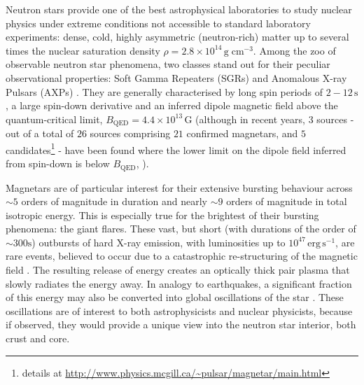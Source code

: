 \documentclass[numberedappendix]{emulateapj}
\begin{document}
Neutron stars provide one of the best astrophysical laboratories to study nuclear physics under extreme conditions not accessible to standard laboratory experiments: dense, cold, highly asymmetric (neutron-rich) matter up to several times the nuclear saturation density $\rho = 2.8\times10^{14} \, \mathrm{g}\; \mathrm{cm}^{-3}$.
Among the zoo of observable neutron star phenomena, two classes stand out for their peculiar observational properties: Soft Gamma Repeaters (SGRs) and Anomalous X-ray Pulsars (AXPs) \citep[both classes are  \textit{magnetars}; for a general overview, see ][]{woods2006,mereghetti2011}.
They are generally characterised by long spin periods of $2 - 12 \, \mathrm{s}$, a large spin-down derivative and an inferred dipole magnetic field above the quantum-critical limit, $B_{\mathrm{QED}} = 4.4 \times 10^{13} \, \mathrm{G}$ (although in recent years, $3$ sources - out of a total of $26$ sources comprising $21$ confirmed magnetars, and $5$ candidates\footnote{details at \url{http://www.physics.mcgill.ca/~pulsar/magnetar/main.html}} - have been found where the lower limit on the dipole field inferred from spin-down is below $B_{\mathrm{QED}}$,  \citet{vanderhorst2010,esposito2010,rea2010,rea2012,scholz2012,rea2014}). 

Magnetars are of particular interest for their extensive bursting behaviour across $\sim\!\! 5$ orders of magnitude in duration and nearly $\sim\!\! 9$ orders of magnitude in total isotropic energy. This is especially true for the brightest of their bursting phenomena: the giant flares. These vast, but short (with durations of the order of $\sim\!\! 300\mathrm{s}$) outbursts of hard X-ray emission, with luminosities up to $10^{47}\,\mathrm{erg}\, \mathrm{s}^{-1}$, are rare events, believed to occur due to a catastrophic re-structuring of the magnetic field \citep{thompson1995,lyutikov2003}.  The resulting release of energy creates an optically thick pair plasma that slowly radiates the energy away. In analogy to earthquakes, a significant fraction of this energy may also be converted into global oscillations of the star \citep{duncan1998}. These oscillations are of interest to both astrophysicists and nuclear physicists, because if observed, they would provide a unique view into the neutron star interior, both crust and core. 
\end{document}
